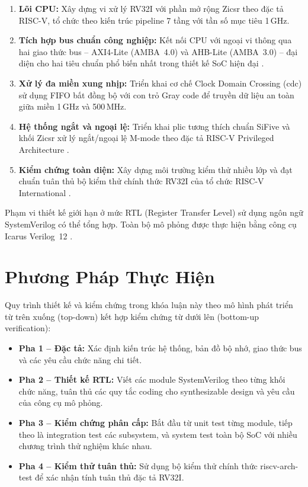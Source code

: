 \begin{enumerate}
    \item \textbf{Lõi CPU:} Xây dựng vi xử lý RV32I với phần mở rộng Zicsr theo đặc tả RISC-V, tổ chức theo kiến trúc pipeline 7 tầng với tần số mục tiêu 1\,GHz.
    \item \textbf{Tích hợp bus chuẩn công nghiệp:} Kết nối CPU với ngoại vi thông qua hai giao thức bus -- AXI4-Lite (AMBA~4.0) và AHB-Lite (AMBA~3.0) -- đại diện cho hai tiêu chuẩn phổ biến nhất trong thiết kế SoC hiện đại \cite{amba-axi-spec, amba-ahb-spec}.
    \item \textbf{Xử lý đa miền xung nhịp:} Triển khai cơ chế Clock Domain Crossing (\acrshort{cdc}) sử dụng FIFO bất đồng bộ với con trỏ Gray code để truyền dữ liệu an toàn giữa miền 1\,GHz và 500\,MHz.
    \item \textbf{Hệ thống ngắt và ngoại lệ:} Triển khai \acrfull{plic} tương thích chuẩn SiFive và khối Zicsr xử lý ngắt/ngoại lệ M-mode theo đặc tả RISC-V Privileged Architecture \cite{riscv-priv-spec}.
    \item \textbf{Kiểm chứng toàn diện:} Xây dựng môi trường kiểm thử nhiều lớp và đạt chuẩn tuân thủ bộ kiểm thử chính thức RV32I của tổ chức RISC-V International \cite{riscv-arch-test}.
\end{enumerate}

Phạm vi thiết kế giới hạn ở mức RTL (Register Transfer Level) sử dụng ngôn ngữ SystemVerilog có thể tổng hợp. Toàn bộ mô phỏng được thực hiện bằng công cụ Icarus Verilog~12 \cite{icarus-verilog}.

\section{Phương Pháp Thực Hiện}

Quy trình thiết kế và kiểm chứng trong khóa luận này theo mô hình phát triển từ trên xuống (top-down) kết hợp kiểm chứng từ dưới lên (bottom-up verification):

\begin{itemize}
    \item \textbf{Pha 1 -- Đặc tả:} Xác định kiến trúc hệ thống, bản đồ bộ nhớ, giao thức bus và các yêu cầu chức năng chi tiết.
    \item \textbf{Pha 2 -- Thiết kế RTL:} Viết các module SystemVerilog theo từng khối chức năng, tuân thủ các quy tắc coding cho synthesizable design và yêu cầu của công cụ mô phỏng.
    \item \textbf{Pha 3 -- Kiểm chứng phân cấp:} Bắt đầu từ unit test từng module, tiếp theo là integration test các subsystem, và system test toàn bộ SoC với nhiều chương trình thử nghiệm khác nhau.
    \item \textbf{Pha 4 -- Kiểm thử tuân thủ:} Sử dụng bộ kiểm thử chính thức riscv-arch-test để xác nhận tính tuân thủ đặc tả RV32I.
\end{itemize}

